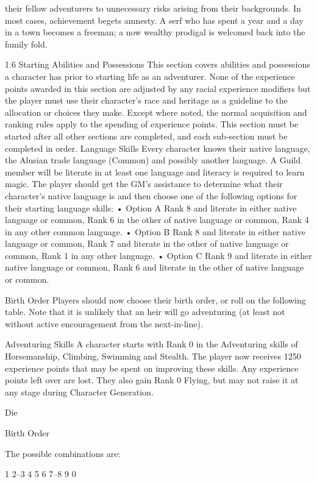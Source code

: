 \documentclass[a4paper]{article}
\begin{document}
\begin{multicols}{3}
their fellow adventurers to unnecessary risks arising from their backgrounds.
In most cases, achievement begets amnesty. A serf
who has spent a year and a day in a town becomes
a freeman; a now wealthy prodigal is welcomed
back into the family fold.

1.6 Starting Abilities and Possessions
This section covers abilities and possessions a
character has prior to starting life as an adventurer.
None of the experience points awarded in this
section are adjusted by any racial experience modifiers but the player must use their character’s race
and heritage as a guideline to the allocation or
choices they make. Except where noted, the normal
acquisition and ranking rules apply to the spending
of experience points. This section must be started
after all other sections are completed, and each
sub-section must be completed in order.
Language Skills
Every character knows their native language, the
Alusian trade language (Common) and possibly
another language. A Guild member will be literate
in at least one language and literacy is required to
learn magic.
The player should get the GM’s assistance to determine what their character’s native language is
and then choose one of the following options for
their starting language skills:
• Option A Rank 8 and literate in either native
language or common, Rank 6 in the other of native
language or common, Rank 4 in any other common
language.
• Option B Rank 8 and literate in either native
language or common, Rank 7 and literate in the
other of native language or common, Rank 1 in any
other language.
• Option C Rank 9 and literate in either native
language or common, Rank 6 and literate in the
other of native language or common.

Birth Order
Players should now choose their birth order, or roll
on the following table. Note that it is unlikely that
an heir will go adventuring (at least not without
active encouragement from the next-in-line).

Adventuring Skills
A character starts with Rank 0 in the Adventuring
skills of Horsemanship, Climbing, Swimming and
Stealth. The player now receives 1250 experience
points that may be spent on improving these skills.
Any experience points left over are lost. They also
gain Rank 0 Flying, but may not raise it at any
stage during Character Generation.

Die

Birth Order

The possible combinations are:

1
2–3
4
5
6
7–8
9
0


\end{multicols}
\end{document}
